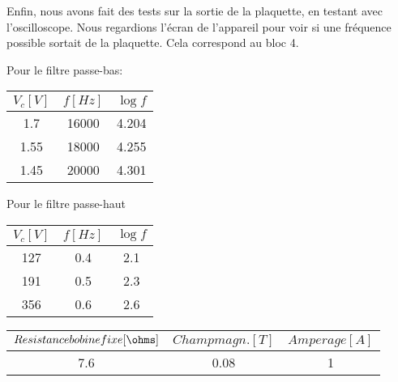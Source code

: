 Enfin, nous avons fait des tests sur la sortie de la plaquette, en testant avec l'oscilloscope.  Nous regardions l'écran de
l'appareil pour voir si une fréquence possible sortait de la plaquette.  Cela correspond au bloc 4.



Pour le filtre passe-bas:
\begin{center}
\begin{tabular}{|c|c|c|}
\hline
$V_c[V]$ & $f[Hz]$ & $\log{f}$ \\
\hline
1.7 & 16000 & 4.204 \\
\hline
1.55 & 18000 & 4.255 \\
\hline
1.45 & 20000 & 4.301 \\
\hline
\end{tabular}
\end{center}

Pour le filtre passe-haut

\begin{center}
	\begin{tabular}{|c|c|c|}
		\hline
		$V_c[V]$ & $f[Hz]$ & $\log{f}$ \\
		\hline
		127 & 0.4 & 2.1\\
		\hline
		191 & 0.5 & 2.3\\
		\hline
		356 & 0.6 & 2.6 \\
		\hline
	\end{tabular}
\end{center}

\begin{center}
	\begin{tabular}{|c|c|c|}
		\hline
		$Resistance bobine fixe[\ohms]$ & $Champ magn.[T]$ & $Amperage[A]$ \\
		\hline
		7.6 & 0.08 & 1\\
		\hline
	\end{tabular}
\end{center}



